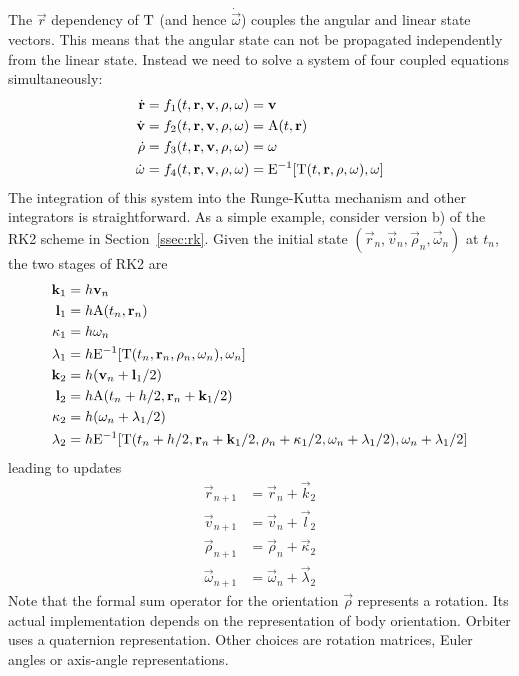 \documentclass[Orbiter Technical Reference.tex]{subfiles}
\begin{document}
The $\vec{r}$ dependency of $\mathrm{T}$ (and hence $\dot{\vec\omega}$) couples the angular and linear state vectors. This means that the angular state can not be propagated independently from the linear state. Instead we need to solve a system of four coupled equations simultaneously:
\begin{equation}
\begin{split}
\dot{\mathbf{r}} &= f_1(t,\mathbf{r},\mathbf{v},\mathbf{\rho},\mathbf{\omega}) = \mathbf{v} \\
\dot{\mathbf{v}} &= f_2(t,\mathbf{r},\mathbf{v},\mathbf{\rho},\mathbf{\omega}) = \mathrm{A}(t,\mathbf{r}) \\
\dot{\mathbf{\rho}} &= f_3(t,\mathbf{r},\mathbf{v},\mathbf{\rho},\mathbf{\omega}) = \mathbf{\omega} \\
\dot{\mathbf{\omega}} &= f_4(t,\mathbf{r},\mathbf{v},\mathbf{\rho},\mathbf{\omega}) = \mathrm{E}^{-1}[\mathrm{T}(t,\mathbf{r},\mathbf{\rho},\mathbf{\omega}),\mathbf{\omega}]
\end{split}
\end{equation}
The integration of this system into the Runge-Kutta mechanism and other integrators is straightforward. As a simple example, consider version b) of the RK2 scheme in Section~\ref{ssec:rk}.
Given the initial state $(\vec{r}_n, \vec{v}_n, \vec\rho_n, \vec\omega_n)$ at $t_n$,
the two stages of RK2 are
\begin{equation}
\begin{split}
\mathbf{k}_1 &= h\mathbf{v}_n \\
\mathbf{l}_1 &= h\mathrm{A}(t_n, \mathbf{r}_n) \\
\mathbf{\kappa}_1 &= h\mathbf{\omega}_n \\
\mathbf{\lambda}_1 &= h \mathrm{E}^{-1}[\mathrm{T}(t_n,\mathbf{r}_n,\mathbf{\rho}_n,\mathbf{\omega}_n),\mathbf{\omega}_n] \\
\mathbf{k}_2 &= h(\mathbf{v}_n+\mathbf{l}_1/2) \\
\mathbf{l}_2 &= h\mathrm{A}(t_n+h/2, \mathbf{r}_n+\mathbf{k}_1/2) \\
\mathbf{\kappa}_2 &= h(\mathbf{\omega}_n + \mathbf{\lambda}_1/2) \\
\mathbf{\lambda}_2 &= h\mathrm{E}^{-1}[\mathrm{T}(t_n+h/2,\mathbf{r}_n+\mathbf{k}_1/2,\mathbf{\rho}_n+\mathbf{\kappa}_1/2,\mathbf{\omega}_n+\mathbf{\lambda}_1/2),\mathbf{\omega}_n+\mathbf{\lambda}_1/2]
\end{split}
\end{equation}
leading to updates
\begin{equation}
\begin{split}
\vec{r}_{n+1} &= \vec{r}_n + \vec{k}_2 \\
\vec{v}_{n+1} &= \vec{v}_n + \vec{l}_2 \\
\vec\rho_{n+1} &= \vec\rho_n + \vec\kappa_2 \\
\vec\omega_{n+1} &= \vec\omega_n + \vec\lambda_2
\end{split}
\end{equation}
Note that the formal sum operator for the orientation $\vec\rho$ represents a rotation. Its actual implementation depends on the representation of body orientation. Orbiter uses a quaternion representation. Other choices are rotation matrices, Euler angles or axis-angle representations.
\end{document}
